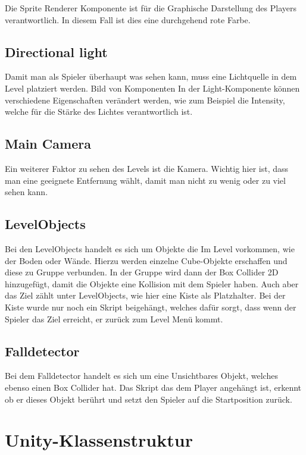 Die Sprite Renderer Komponente ist für die Graphische Darstellung des Players verantwortlich. In diesem Fall ist dies eine durchgehend rote Farbe.

\subsection{Directional light}
Damit man als Spieler überhaupt was sehen kann, muss eine Lichtquelle in dem Level platziert werden.
Bild von Komponenten
In der Light-Komponente können verschiedene Eigenschaften verändert werden, wie zum Beispiel die Intensity, welche für die Stärke des Lichtes verantwortlich ist.
\subsection{Main Camera}
Ein weiterer Faktor zu sehen des Levels ist die Kamera. Wichtig hier ist, dass man eine geeignete Entfernung wählt, damit man nicht zu wenig oder zu viel sehen kann.
\subsection{LevelObjects}
Bei den LevelObjects handelt es sich um Objekte die Im Level vorkommen, wie der Boden oder Wände. Hierzu werden einzelne Cube-Objekte erschaffen und diese zu Gruppe verbunden. In der Gruppe wird dann der Box Collider 2D hinzugefügt, damit die Objekte eine Kollision mit dem Spieler haben. Auch aber das Ziel zählt unter LevelObjects, wie hier eine Kiste als Platzhalter. Bei der Kiste wurde nur noch ein Skript beigehängt, welches dafür sorgt, dass wenn der Spieler das Ziel erreicht, er zurück zum Level Menü kommt.
\subsection{Falldetector}
Bei dem Falldetector handelt es sich um eine Unsichtbares Objekt, welches ebenso einen Box Collider hat. Das Skript das dem Player angehängt ist, erkennt ob er dieses Objekt berührt und setzt den Spieler auf die Startposition zurück.


\section{Unity-Klassenstruktur}
